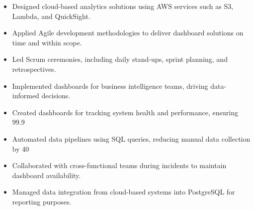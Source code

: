 \par\smallskip
\noindent
\begin{minipage}{20cm}
  \begin{minipage}{9.75cm}
    \begin{itemize}
      \item Designed cloud-based analytics solutions using AWS services such as S3, Lambda, and QuickSight.
      \item Applied Agile development methodologies to deliver dashboard solutions on time and within scope.
    \end{itemize}
  \end{minipage}
  \hfill
  \begin{minipage}{9.75cm}
    \begin{itemize}
      \item Led Scrum ceremonies, including daily stand-ups, sprint planning, and retrospectives.
      \item Implemented dashboards for business intelligence teams, driving data-informed decisions.
    \end{itemize}
  \end{minipage}
\end{minipage}
\par\smallskip
\divider

\par\smallskip
\noindent
\begin{minipage}{20cm}
  \begin{minipage}{9.75cm}
    \begin{itemize}
      \item Created dashboards for tracking system health and performance, ensuring 99.9%
      \item Automated data pipelines using SQL queries, reducing manual data collection by 40%
    \end{itemize}
  \end{minipage}
  \hfill
  \begin{minipage}{9.75cm}
    \begin{itemize}
      \item Collaborated with cross-functional teams during incidents to maintain dashboard availability.
      \item Managed data integration from cloud-based systems into PostgreSQL for reporting purposes.
    \end{itemize}
  \end{minipage}
\end{minipage}

